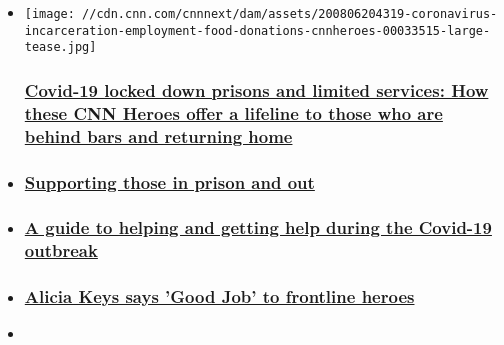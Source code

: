 \begin{itemize}
\item
  \href{/2020/08/06/us/coronavirus-incarceration-obstacles-employment-food-donations-cnnheroes/index.html}{}

  \texttt{[image: //cdn.cnn.com/cnnnext/dam/assets/200806204319-coronavirus-incarceration-employment-food-donations-cnnheroes-00033515-large-tease.jpg]}

  \hypertarget{covid-19-locked-down-prisons-and-limited-services-how-these-cnn-heroes-offer-a-lifeline-to-those-who-are-behind-bars-and-returning-home}{%
  \subsubsection{\texorpdfstring{\href{/2020/08/06/us/coronavirus-incarceration-obstacles-employment-food-donations-cnnheroes/index.html}{Covid-19
  locked down prisons and limited services: How these CNN Heroes offer a
  lifeline to those who are behind bars and returning
  home}}{Covid-19 locked down prisons and limited services: How these CNN Heroes offer a lifeline to those who are behind bars and returning home}}\label{covid-19-locked-down-prisons-and-limited-services-how-these-cnn-heroes-offer-a-lifeline-to-those-who-are-behind-bars-and-returning-home}}
\item
  \hypertarget{supporting-those-in-prison-and-out}{%
  \subsubsection{\texorpdfstring{\href{/videos/tv/2020/08/06/coronavirus-incarceration-employment-food-donations-cnnheroes.cnn}{Supporting
  those in prison and
  out}}{Supporting those in prison and out}}\label{supporting-those-in-prison-and-out}}
\item
  \hypertarget{a-guide-to-helping-and-getting-help-during-the-covid-19-outbreak}{%
  \subsubsection{\texorpdfstring{\href{https://www.cnn.com/interactive/2020/health/coronavirus-how-to-help/}{A
  guide to helping and getting help during the Covid-19
  outbreak}}{A guide to helping and getting help during the Covid-19 outbreak}}\label{a-guide-to-helping-and-getting-help-during-the-covid-19-outbreak}}
\item
  \hypertarget{alicia-keys-says-good-job-to-frontline-heroes}{%
  \subsubsection{\texorpdfstring{\href{/videos/tv/2020/05/20/alicia-keys-coronavirus-good-job-challenge-cnnheroes.cnn}{Alicia
  Keys says 'Good Job' to frontline
  heroes}}{Alicia Keys says 'Good Job' to frontline heroes}}\label{alicia-keys-says-good-job-to-frontline-heroes}}
\item
  \hypertarget{cnn-heroes-find-hope-during-the-pandemic}{%
}
\end{itemize}
